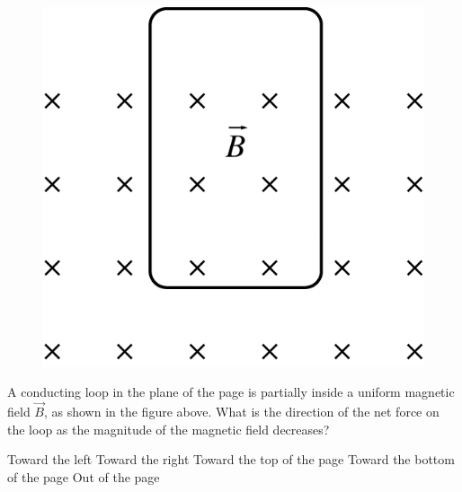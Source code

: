 \begin{figure}[H]
\centering
\includegraphics[scale=0.25]{images/img-011-034.png}
\end{figure}

\begin{questions}\setcounter{question}{23}\question
A conducting loop in the plane of the page is partially inside a uniform magnetic field $\vec{B}$, as shown in the figure above. What is the direction of the net force on the loop as the magnitude of the magnetic field decreases?

\begin{choices}
\choice Toward the left
\choice Toward the right
\choice Toward the top of the page
\choice Toward the bottom of the page
\choice Out of the page
\end{choices}\end{questions}


